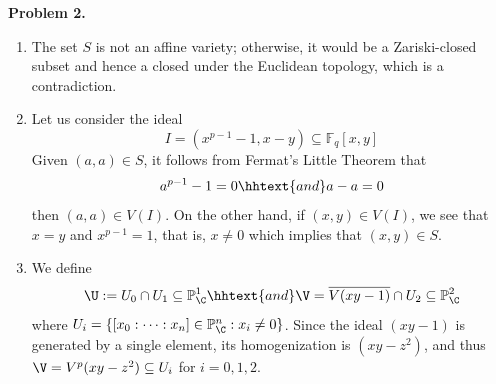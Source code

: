 \documentclass{article}
\begin{document}
\vspace{5mm}
\noindent\textbf{Problem 2.}
\begin{enumerate}
    \item[(a)] The set $S$ is not an affine variety; otherwise, it would be a Zariski-closed 
    subset and hence a closed under the Euclidean topology, which is a contradiction.

    \item[(b)] Let us consider the ideal
    \begin{equation*}
        I=(x^{p-1}-1,x-y)\subseteq\mathbb{F}_{q}[x,y]
    \end{equation*}
    Given $(a,a)\in S$, it follows from Fermat's Little Theorem that
    \begin{equation*}
        a^{p-1}-1=0 \hhtext{and} a-a=0
    \end{equation*}
    then $(a,a)\in V(I)$. On the other hand, if $(x,y)\in V(I)$, we see that $x=y$ and 
    $x^{p-1}=1$, that is, $x\neq0$ which implies that $(x,y)\in S$.

    \item[(c)] We define
    \begin{equation*}
        \U:=U_{0}\cap U_{1}\subseteq\mathbb{P}_{\C}^{1} \hhtext{and} 
        \V=\overline{V(xy-1)}\cap U_{2}\subseteq\mathbb{P}_{\C}^{2}
    \end{equation*}
    where $U_{i}=\{[x_{0}:\dots:x_{n}]\in\mathbb{P}_{\C}^{n}:x_{i}\neq0\}$. Since the ideal 
    $(xy-1)$ is generated by a single element, its homogenization is $(xy-z^{2})$, and thus 
    $\V=V^{p}(xy-z^{2})\subseteq U_{i}$ for $i=0,1,2$.


\end{enumerate}
\end{document}
